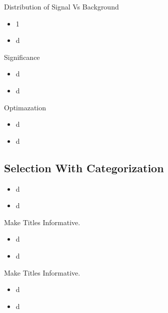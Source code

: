 \documentclass{beamer}
\begin{document}
\begin{frame}{Distribution of Signal Vs Background}
    \begin{itemize}
    \item
      1 
    \item
       d 
    \end{itemize}
\end{frame}



\begin{frame}{Significance}
    \begin{itemize}
    \item
       d
    \item
        d
    \end{itemize}
\end{frame}



\begin{frame}{Optimazation}
    \begin{itemize}
    \item
       d
    \item
        d
    \end{itemize}
\end{frame}


\subsection{Selection With Categorization}


\begin{frame}{}
    \begin{itemize}
    \item
       d
    \item
        d
    \end{itemize}
\end{frame}

\begin{frame}{Make Titles Informative.}
    \begin{itemize}
    \item
       d
    \item
        d
    \end{itemize}
\end{frame}

\begin{frame}{Make Titles Informative.}
    \begin{itemize}
    \item
       d
    \item
        d
    \end{itemize}
\end{frame}
\end{document}
